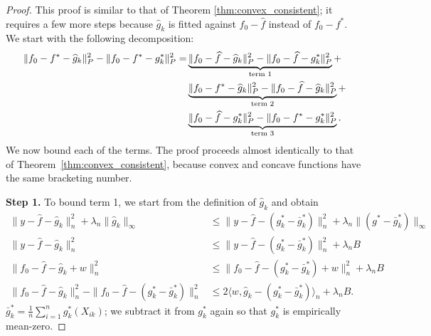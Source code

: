 \documentclass[12pt,pdftex,aos,noinfoline,addressasfootnote]{imsart}
\begin{document}
\begin{proof}
This proof is similar to that of Theorem \ref{thm:convex_consistent}; it requires a few more steps because $\hat{g}_k$ is fitted against $f_0 - \hat{f}$ instead of $f_0 - f^*$. We start with the following decomposition:
\begin{align}
\| f_0 - f^* - \widehat{g}_k \|_P^2 - \| f_0 - f^* - g^*_k \|_P^2 = & \underbrace{\| f_0 - \widehat{f} - \widehat{g}_k \|_P^2 - \| f_0 - \widehat{f} - g^*_k  \|_P^2}_{\textrm{term 1}} + \nonumber \\
   & \underbrace{\| f_0 - f^* - \widehat{g}_k \|_P^2 - \| f_0 - \widehat{f} - \widehat{g}_k \|_P^2}_{\textrm{term 2}} + \nonumber \\
   & \underbrace{\| f_0 - \widehat{f} - g^*_k \|_P^2 - \| f_0 - f^* - g^*_k \|_P^2}_{\textrm{term 3}}  \label{eqn:concave_init_decomposition}.
\end{align}
We now bound each of the terms. The proof proceeds almost identically to that of Theorem~\ref{thm:convex_consistent}, because convex and concave functions have the same bracketing number.

\textbf{Step 1.} To bound term 1, we start from the definition of
$\hat{g}_k$ and obtain
\begin{align*}
\| y - \hat{f} - \hat{g}_k \|_n^2 + \lambda_n \| \hat{g}_k \|_\infty &\leq
   \| y - \hat{f} - (g^*_k - \bar{g}^*_k) \|_n^2 + \lambda_n \| (g^*-\bar{g}^*_k) \|_\infty \\
\| y - \hat{f} - \hat{g}_k \|_n^2 &\leq \| y - \hat{f} - (g^*_k-\bar{g}^*_k) \|_n^2 + \lambda_n B \\[10pt]
\| f_0 - \hat{f} - \hat{g}_k + w\|_n^2 & \leq \| f_0 - \hat{f} - (g^*_k-\bar{g}^*_k) + w \|_n^2 
   +\lambda_n B \\
\| f_0 - \hat{f} - \hat{g}_k \|_n^2 - \|f_0 -\hat{f} - (g^*_k-\bar{g}^*_k) \|_n^2 &\leq
   2 \langle w, \hat{g}_k - (g^*_k-\bar{g}^*_k) \rangle_n + \lambda_n B.
\end{align*}
$\bar{g}^*_k = \frac{1}{n} \sum_{i=1}^n g^*_k(X_{ik})$; we subtract it from $g^*_k$ again so that $g^*_k$ is empirically mean-zero. 


\end{proof}
\end{document}
